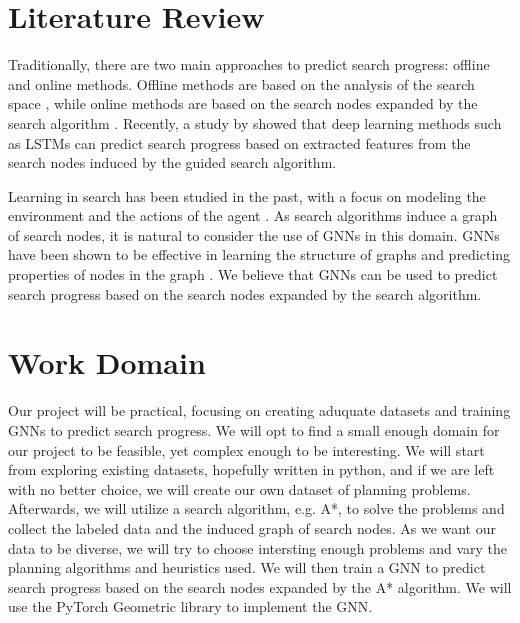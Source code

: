 \documentclass[11pt]{article}
\begin{document}
\section{Literature Review}

Traditionally, there are two main approaches to predict search progress: offline and online methods. Offline methods are based on the analysis of the search space \cite{??,??}, while online methods are based on the search nodes expanded by the search algorithm \cite{??,??}. Recently, a study by \citet{sudry2022learning} showed that deep learning methods such as LSTMs can predict search progress based on extracted features from the search nodes induced by the guided search algorithm. 

Learning in search has been studied in the past, with a focus on modeling the environment and the actions of the agent \cite{??,??}. As search algorithms induce a graph of search nodes, it is natural to consider the use of GNNs in this domain. GNNs have been shown to be effective in learning the structure of graphs and predicting properties of nodes in the graph \cite{??,??}. We believe that GNNs can be used to predict search progress based on the search nodes expanded by the search algorithm.


\section{Work Domain}

Our project will be practical, focusing on creating aduquate datasets and training GNNs to predict search progress. 
We will opt to find a small enough domain for our project to be feasible, yet complex enough to be interesting. We will start from exploring existing datasets, hopefully written in python, and if we are left with no better choice, we will create our own dataset of planning problems. Afterwards, we will utilize a search algorithm, e.g. A*, to solve the problems and collect the labeled data and the induced graph of search nodes. As we want our data to be diverse, we will try to choose intersting enough problems and vary the planning algorithms and heuristics used. We will then train a GNN to predict search progress based on the search nodes expanded by the A* algorithm. We will use the PyTorch Geometric library to implement the GNN.


\end{document}
